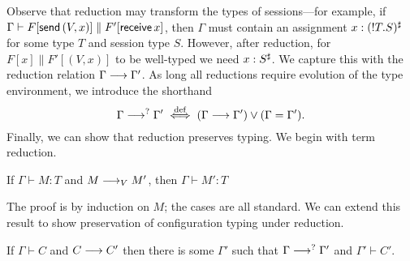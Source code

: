 \documentclass[orivec,envcountsame]{llncs}
\begin{document}
Observe that reduction may transform the types of sessions---for example, if $\Gamma \vdash
F[\mathsf{send}\,(V,x)] \parallel F'[\mathsf{receive}\, x]$, then $\Gamma$ must contain an
assignment $x : ({!T.S})^\sharp$ for some type $T$ and session type $S$.  However, after
reduction, for $F[x] \parallel F'[(V,x)]$ to be well-typed we need $x:S^\sharp$.  We capture this
with the reduction relation $\Gamma \longrightarrow \Gamma'$.  As long all reductions require evolution of
the type environment, we introduce the shorthand
\[
  \Gamma \longrightarrow^? \Gamma' \stackrel{\mathrm{def}}{\iff} (\Gamma \longrightarrow \Gamma') \lor (\Gamma = \Gamma').
\]
Finally, we can show that reduction preserves typing.  We begin with term reduction.
%
\begin{lemma}\label{thm:term-preservation}
  If $\Gamma \vdash M: T$ and $M \longrightarrow_V M'$, then $\Gamma \vdash M': T$
\end{lemma}
%
The proof is by induction on $M$; the cases are all standard.  We can extend this result to show
preservation of configuration typing under reduction.
%
\begin{theorem}\label{thm:preservation}
  If $\Gamma \vdash C$ and $C \longrightarrow C'$ then there is some $\Gamma'$ such that $\Gamma \longrightarrow^?
  \Gamma'$ and $\Gamma' \vdash C'$.
\end{theorem}
%
\end{document}
